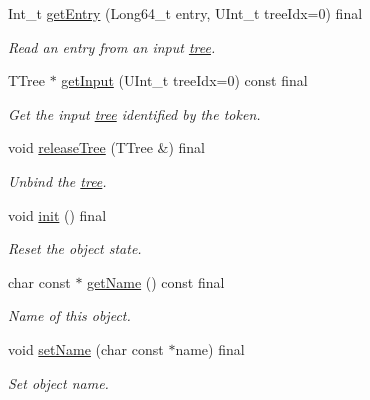 \begin{DoxyCompactItemize}
Int\_\-t \hyperlink{classpanda_1_1TreeEntry_a6ac8a1bad151367648aedd366011172d}{getEntry} (Long64\_\-t entry, UInt\_\-t treeIdx=0) final
\begin{DoxyCompactList}\small\item\em Read an entry from an input \hyperlink{namespacepanda_1_1tree}{tree}. \item\end{DoxyCompactList}\item 
TTree $\ast$ \hyperlink{classpanda_1_1TreeEntry_a3e0841eb1ddb6e85e37413e4866101b6}{getInput} (UInt\_\-t treeIdx=0) const final
\begin{DoxyCompactList}\small\item\em Get the input \hyperlink{namespacepanda_1_1tree}{tree} identified by the token. \item\end{DoxyCompactList}\item 
void \hyperlink{classpanda_1_1TreeEntry_a3d54b23c121628d22c65c26482d7cab0}{releaseTree} (TTree \&) final
\begin{DoxyCompactList}\small\item\em Unbind the \hyperlink{namespacepanda_1_1tree}{tree}. \item\end{DoxyCompactList}\item 
void \hyperlink{classpanda_1_1TreeEntry_a734130107a3568d87eb6570ab9b9ee60}{init} () final
\begin{DoxyCompactList}\small\item\em Reset the object state. \item\end{DoxyCompactList}\item 
char const $\ast$ \hyperlink{classpanda_1_1TreeEntry_afbd2a566ad42c6f5e4ce0183cde65c20}{getName} () const final
\begin{DoxyCompactList}\small\item\em Name of this object. \item\end{DoxyCompactList}\item 
void \hyperlink{classpanda_1_1TreeEntry_aa0f473dd6eca2ae68ef9b9cb37d909bb}{setName} (char const $\ast$name) final
\begin{DoxyCompactList}\small\item\em Set object name. \item\end{DoxyCompactList}\end{DoxyCompactItemize}
